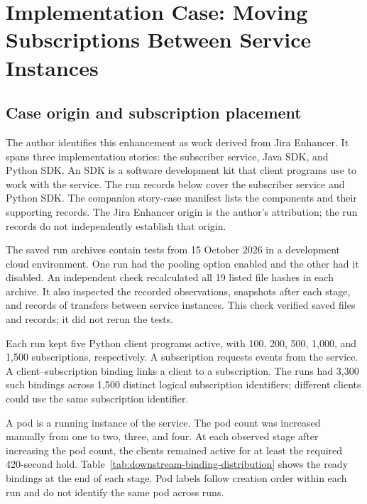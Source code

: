 \documentclass[10pt,a4paper]{article}
\begin{document}
\section{Implementation Case: Moving Subscriptions Between Service Instances}\label{sec:downstream-rebalancing-case}

\subsection{Case origin and subscription placement}
The author identifies this enhancement as work derived from Jira Enhancer. It spans three implementation stories: the subscriber service, Java SDK, and Python SDK. An SDK is a software development kit that client programs use to work with the service. The run records below cover the subscriber service and Python SDK. The companion story-case manifest lists the components and their supporting records. The Jira Enhancer origin is the author's attribution; the run records do not independently establish that origin.

The saved run archives contain tests from 15 October 2026 in a development cloud environment. One run had the pooling option enabled and the other had it disabled. An independent check recalculated all 19 listed file hashes in each archive. It also inspected the recorded observations, snapshots after each stage, and records of transfers between service instances. This check verified saved files and records; it did not rerun the tests.

Each run kept five Python client programs active, with 100, 200, 500, 1,000, and 1,500 subscriptions, respectively. A subscription requests events from the service. A client--subscription binding links a client to a subscription. The runs had 3,300 such bindings across 1,500 distinct logical subscription identifiers; different clients could use the same subscription identifier.

A pod is a running instance of the service. The pod count was increased manually from one to two, three, and four. At each observed stage after increasing the pod count, the clients remained active for at least the required 420-second hold. Table~\ref{tab:downstream-binding-distribution} shows the ready bindings at the end of each stage. Pod labels follow creation order within each run and do not identify the same pod across runs.
\end{document}
